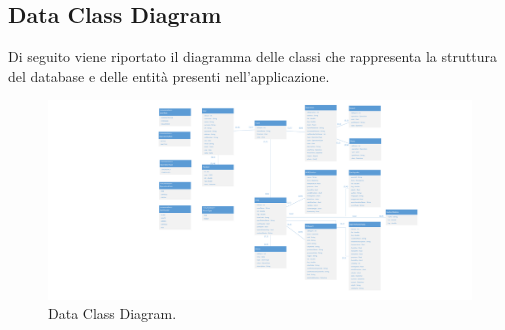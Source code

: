 \begin{landscape}
\section{Data Class Diagram}
Di seguito viene riportato il diagramma delle classi che rappresenta la struttura del database e delle entità presenti nell'applicazione.

\begin{figure}[h!]
	\centering
	\includegraphics[width=0.8\linewidth]{./Iterazione 1/OtherFiles/UML - Data Class View}
	\caption{Data Class Diagram.}
	\label{fig:DataClassDiagram}
\end{figure}
\end{landscape}